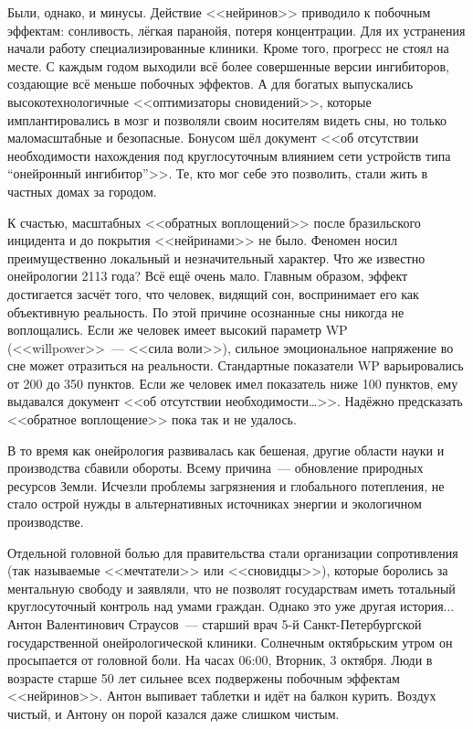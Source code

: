\documentclass[openany, oneside]{book}
\begin{document}
Были, однако, и минусы. Действие <<нейринов>> приводило к побочным эффектам: сонливость, лёгкая паранойя, потеря концентрации. Для их устранения начали работу специализированные клиники. Кроме того, прогресс не стоял на месте. С каждым годом выходили всё более совершенные версии ингибиторов, создающие всё меньше побочных эффектов. А для богатых выпускались высокотехнологичные <<оптимизаторы сновидений>>, которые имплантировались в мозг и позволяли своим носителям видеть сны, но только маломасштабные и безопасные. Бонусом шёл документ <<об отсутствии необходимости нахождения под круглосуточным влиянием сети устройств типа ``онейронный ингибитор''>>. Те, кто мог себе это позволить, стали жить в частных домах за городом.

К счастью, масштабных <<обратных воплощений>> после бразильского инцидента и до покрытия <<нейринами>> не было. Феномен носил преимущественно локальный и незначительный характер. Что же известно онейрологии 2113 года? Всё ещё очень мало. Главным образом, эффект достигается засчёт того, что человек, видящий сон, воспринимает его как объективную реальность. По этой причине осознанные сны никогда не воплощались. Если же человек имеет высокий параметр WP (<<willpower>>~--- <<сила воли>>), сильное эмоциональное напряжение во сне может отразиться на реальности. Стандартные показатели WP варьировались от 200 до 350 пунктов. Если же человек имел показатель ниже 100 пунктов, ему выдавался документ <<об отсутствии необходимости\dots>>. Надёжно предсказать <<обратное воплощение>> пока так и не удалось.

В то время как онейрология развивалась как бешеная, другие области науки и производства сбавили обороты. Всему причина~--- обновление природных ресурсов Земли. Исчезли проблемы загрязнения и глобального потепления, не стало острой нужды в альтернативных источниках энергии и экологичном производстве.

Отдельной головной болью для правительства стали организации сопротивления (так называемые <<мечтатели>> или <<сновидцы>>), которые боролись за ментальную свободу и заявляли, что не позволят государствам иметь тотальный круглосуточный контроль над умами граждан. Однако это уже другая история...\\

Антон Валентинович Страусов~--- старший врач 5-й Санкт-Петербургской государственной онейрологической клиники. Солнечным октябрьским утром он просыпается от головной боли. На часах 06:00, Вторник, 3 октября. Люди в возрасте старше 50 лет сильнее всех подвержены побочным эффектам <<нейринов>>. Антон выпивает таблетки и идёт на балкон курить. Воздух чистый, и Антону он порой казался даже слишком чистым.
\end{document}
